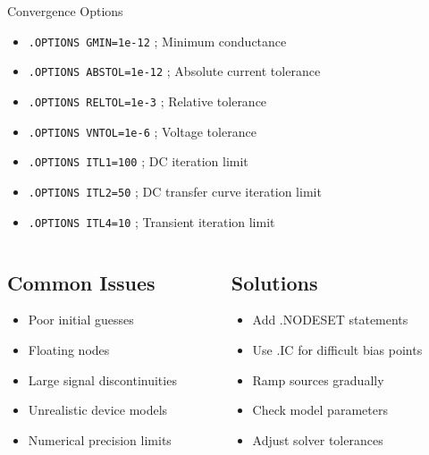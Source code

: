 \documentclass{beamer}
\begin{document}
\begin{frame}{Convergence Options}
    \begin{itemize}
        \item \texttt{.OPTIONS GMIN=1e-12} ; Minimum conductance
        \item \texttt{.OPTIONS ABSTOL=1e-12} ; Absolute current tolerance
        \item \texttt{.OPTIONS RELTOL=1e-3} ; Relative tolerance
        \item \texttt{.OPTIONS VNTOL=1e-6} ; Voltage tolerance
        \item \texttt{.OPTIONS ITL1=100} ; DC iteration limit
        \item \texttt{.OPTIONS ITL2=50} ; DC transfer curve iteration limit
        \item \texttt{.OPTIONS ITL4=10} ; Transient iteration limit
    \end{itemize}
    
    \begin{columns}
        \begin{column}{0.5\textwidth}
            \subsection{Common Issues}
            \begin{itemize}
                \item Poor initial guesses
                \item Floating nodes
                \item Large signal discontinuities
                \item Unrealistic device models
                \item Numerical precision limits
            \end{itemize}
        \end{column}
        \begin{column}{0.5\textwidth}
            \subsection{Solutions}
            \begin{itemize}
                \item Add .NODESET statements
                \item Use .IC for difficult bias points
                \item Ramp sources gradually
                \item Check model parameters
                \item Adjust solver tolerances
            \end{itemize}
        \end{column}
    \end{columns}
\end{frame}
\end{document}
